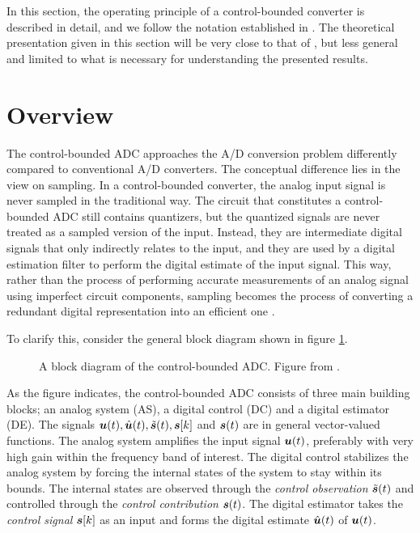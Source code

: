 In this section, the operating principle of a control-bounded converter is described in detail, and we follow the notation established in \cite{cbc_2020_loeliger}. The theoretical presentation given in this section will be very close to that of \cite{malmberg_thesis}, but less general and limited to what is necessary for understanding the presented results.


























\section{Overview}
The control-bounded ADC approaches the A/D conversion problem differently compared to conventional A/D converters. The conceptual difference lies in the view on sampling. In a control-bounded converter, the analog input signal is never sampled in the traditional way. The circuit that constitutes a control-bounded ADC still contains quantizers, but the quantized signals are never treated as a sampled version of the input. Instead, they are intermediate digital signals that only indirectly relates to the input, and they are used by a digital estimation filter to perform the digital estimate of the input signal. This way, rather than the process of performing accurate measurements of an analog signal using imperfect circuit components, sampling becomes the process of converting a redundant digital representation into an efficient one \cite{malmberg_thesis}.

To clarify this, consider the general block diagram shown in figure \ref{fig:cbadc1}.
\begin{figure}[htbp]
    \centering
    
    \caption{A block diagram of the control-bounded ADC. Figure from \cite{malmberg_thesis}.}
    \label{fig:cbadc1}
\end{figure}

As the figure indicates, the control-bounded ADC consists of three main building blocks; an analog system (AS), a digital control (DC) and a digital estimator (DE). The signals $\bm{u}(t), \hat{\bm{u}}(t), \tilde{\bm{s}}(t), \bm{s}[k]$ and $\bm{s}(t)$ are in general vector-valued functions. The analog system amplifies the input signal $\bm{u}(t)$, preferably with very high gain within the frequency band of interest. The digital control stabilizes the analog system by forcing the internal states of the system to stay within its bounds. The internal states are observed through the \textit{control observation} $\tilde{\bm{s}}(t)$ and controlled through the \textit{control contribution} $\bm{s}(t)$. The digital estimator takes the \textit{control signal} $\bm{s}[k]$ as an input and forms the digital estimate $\hat{\bm{u}}(t)$ of $\bm{u}(t)$.

